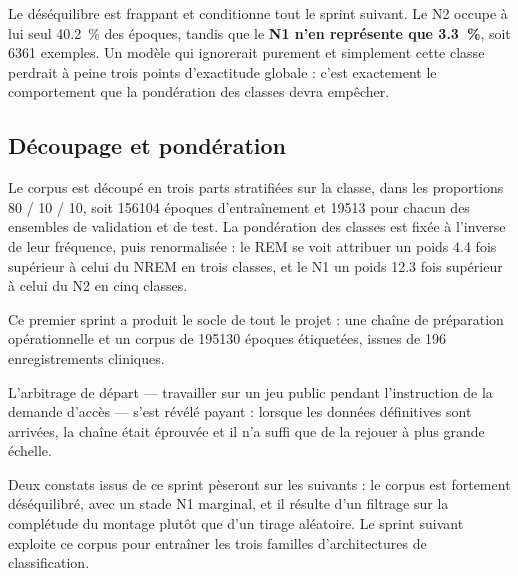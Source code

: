 Le déséquilibre est frappant et conditionne tout le sprint suivant. Le N2 occupe à lui
seul \SI{40,2}{\percent} des époques, tandis que le \textbf{N1 n'en représente que
\SI{3,3}{\percent}}, soit \num{6361} exemples. Un modèle qui ignorerait purement et
simplement cette classe perdrait à peine trois points d'exactitude globale : c'est
exactement le comportement que la pondération des classes devra empêcher.

\subsection{Découpage et pondération}

Le corpus est découpé en trois parts stratifiées sur la classe, dans les proportions
\num{80} / \num{10} / \num{10}, soit \num{156104} époques d'entraînement et \num{19513}
pour chacun des ensembles de validation et de test. La pondération des classes est fixée
à l'inverse de leur fréquence, puis renormalisée : le REM se voit attribuer un poids
\num{4,4} fois supérieur à celui du NREM en trois classes, et le N1 un poids \num{12,3}
fois supérieur à celui du N2 en cinq classes.


Ce premier sprint a produit le socle de tout le projet : une chaîne de préparation
opérationnelle et un corpus de \num{195130} époques étiquetées, issues de 196
enregistrements cliniques.

L'arbitrage de départ --- travailler sur un jeu public pendant l'instruction de la
demande d'accès --- s'est révélé payant : lorsque les données définitives sont arrivées,
la chaîne était éprouvée et il n'a suffi que de la rejouer à plus grande échelle.

Deux constats issus de ce sprint pèseront sur les suivants : le corpus est fortement
déséquilibré, avec un stade N1 marginal, et il résulte d'un filtrage sur la complétude
du montage plutôt que d'un tirage aléatoire. Le sprint suivant exploite ce corpus pour
entraîner les trois familles d'architectures de classification.
